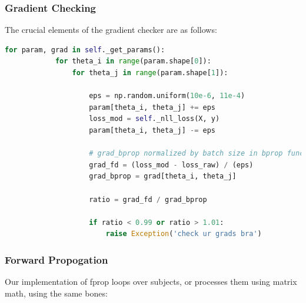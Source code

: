 \documentclass[reqno]{amsart}
\theoremstyle{definition}
\theoremstyle{remark}
\numberwithin{equation}{section}
\begin{document}
\subsubsection{Gradient Checking}

The crucial elements of the gradient checker are as follows: \\

\begin{lstlisting}[language=Python]
        for param, grad in self._get_params():                                  
            for theta_i in range(param.shape[0]):                               
                for theta_j in range(param.shape[1]):                           
                                                                                
                    eps = np.random.uniform(10e-6, 11e-4)
                    param[theta_i, theta_j] += eps
                    loss_mod = self._nll_loss(X, y)      
                    param[theta_i, theta_j] -= eps                              
                    
                    # grad_bprop normalized by batch size in bprop function     
                    grad_fd = (loss_mod - loss_raw) / (eps)                     
                    grad_bprop = grad[theta_i, theta_j]                         
                                                                                
                    ratio = grad_fd / grad_bprop  
                                
                    if ratio < 0.99 or ratio > 1.01:                            
                        raise Exception('check ur grads bra')
\end{lstlisting}

\subsubsection{Forward Propogation}

Our implementation of fprop loops over subjects, or processes them using matrix math, using the same bones:
\end{document}
